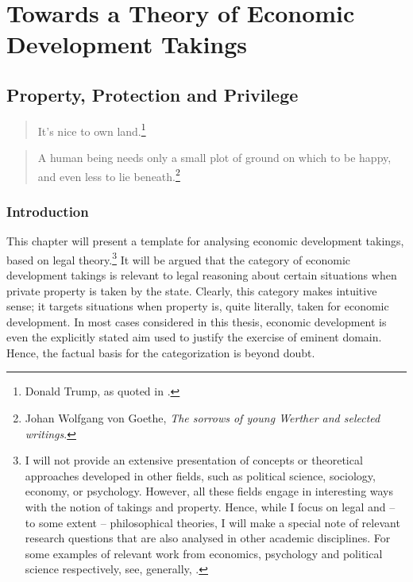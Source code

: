 \newcommand{\isr}[1]{{#1}}

\part{Towards a Theory of Economic Development Takings}

\chapter{Property, Protection and Privilege}\label{chap:1}

\begin{quote}
It's nice to own land.\footnote{Donald Trump, as quoted in \cite{booth12}.}
\end{quote}

\begin{quote}
A human being needs only a small plot of ground on which to be happy, and even less to lie beneath.\footnote{Johan Wolfgang von Goethe, {\it The sorrows of young Werther and selected writings}.}
\end{quote}

\section{Introduction}

This chapter will present a template for analysing economic development takings, based on legal theory.\footnote{I will not provide an extensive presentation of concepts or theoretical approaches developed in other fields, such as political science, sociology, economy, or psychology. However, all these fields engage in interesting ways with the notion of takings and property. Hence, while I focus on legal and --  to some extent -- philosophical theories, I will make a special note of relevant research questions that are also analysed in other academic disciplines. For some examples of relevant work from economics, psychology and political science respectively, see, generally, \cite{miceli11,nadler08,katz97,carruthers04}.} It will be argued that the category of economic development takings is relevant to legal reasoning about certain situations when private property is taken by the state. Clearly, this category makes intuitive sense; it targets situations when property is, quite literally, taken for economic development. In most cases considered in this thesis, economic development is even the explicitly stated aim used to justify the exercise of eminent domain. Hence, the factual basis for the categorization is beyond doubt.

